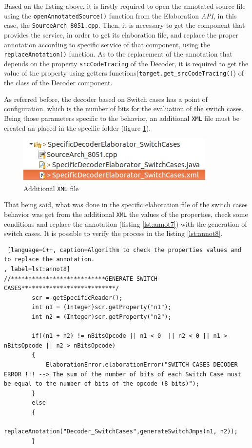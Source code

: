 \documentclass[12pt]{article}
\begin{document}
{Based on the listing above, it is firstly required to open the annotated source file using the \texttt{openAnnotatedSource()} function from the Elaboration \textit{API}, in this case, the \texttt{SourceArch\_8051.cpp}. Then, it is necessary to get the component that provides the service, in order to get its elaboration file, and replace the proper annotation according to specific service of that component, using the \texttt{replaceAnotation()} function. As to the replacement of the annotation that depends on the property \texttt{srcCodeTracing} of the Decoder, it is required to get the value of the property using getters functions(\texttt{target.get\_srcCodeTracing()}) of the class of the Decoder component.

As referred before, the decoder based on Switch cases has a point of configuration, which is the number of bits for the evaluation of the switch cases. Being those parameters specific to the behavior, an additional \texttt{XML} file must be created an placed in the specific folder (figure \ref{fig:decoder_spec10}).

\begin{figure}[H]
\centerline{
\includegraphics[scale=0.5]{images/spec10}
}
\caption{Additional \texttt{XML} file}
\label{fig:decoder_spec10}
\end{figure}

That being said, what was done in the specific elaboration file of the switch cases behavior was get from the additional \texttt{XML} the values of the properties, check some conditions and replace the annotation (listing \ref{lst:annot7}) with the generation of switch cases. It is possible to verify the process in the listing \ref{lst:annot8}.

\begin{lstlisting} [language=C++, caption=Algorithm to check the properties values and to replace the annotation.
, label=lst:annot8]
//***************************GENERATE SWITCH CASES***************************/			
		scr = getSpecificReader();
		int n1 = (Integer)scr.getProperty("n1");
		int n2 = (Integer)scr.getProperty("n2");
		
		if((n1 + n2) != nBitsOpcode || n1 < 0  || n2 < 0 || n1 > nBitsOpcode || n2 > nBitsOpcode)
		{
			ElaborationError.elaborationError("SWITCH CASES DECODER ERROR !!! --> The sum of the number of bits of each Switch Case must be equal to the number of bits of the opcode (8 bits)");
		}
		else
		{
			replaceAnotation("Decoder_SwitchCases",generateSwitchJmps(n1, n2));
		}
\end{lstlisting}

}
\end{document}

